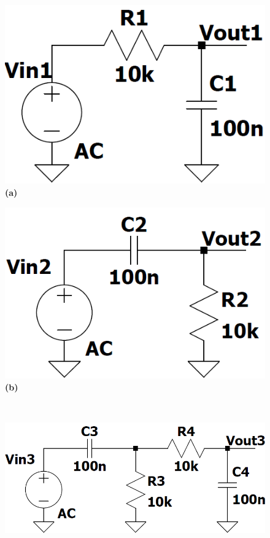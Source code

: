 \begin{figure}[h!]
    \centering
    \begin{minipage}[b]{0.32\linewidth}
        \includegraphics[width=\linewidth]{figuras/circuito_pb.png}
        \centering
        \\ \textbf{(a)}
    \end{minipage}
    \begin{minipage}[b]{0.32\linewidth}
        \includegraphics[width=\linewidth]{figuras/circuito_pa.png}
        \centering
        \\ \textbf{(b)}
    \end{minipage}
    \\
    \begin{minipage}[b]{0.49\linewidth}     
        \includegraphics[width=\linewidth]{figuras/circuito_pf.png}

\end{minipage}
\end{figure}
